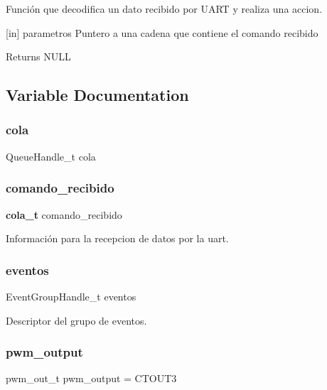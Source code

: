 Función que decodifica un dato recibido por U\+A\+RT y realiza una accion. 

[in] parametros Puntero a una cadena que contiene el comando recibido \begin{DoxyReturn}{Returns}
N\+U\+LL 
\end{DoxyReturn}


\subsection{Variable Documentation}
\mbox{\label{group__ejemplos_ga993b0270bc6a91f54621589ee6db4183}} 
\subsubsection{cola}
{\footnotesize\ttfamily Queue\+Handle\+\_\+t cola}

\mbox{\label{group__ejemplos_gae97d591c9b58416e82dd9dcdb95b685f}} 
\subsubsection{comando\+\_\+recibido}
{\footnotesize\ttfamily \textbf{ cola\+\_\+t} comando\+\_\+recibido}



Información para la recepcion de datos por la uart. 

\mbox{\label{group__ejemplos_ga206fec25e2c681344c76edfaae89c99c}} 
\subsubsection{eventos}
{\footnotesize\ttfamily Event\+Group\+Handle\+\_\+t eventos}



Descriptor del grupo de eventos. 

\mbox{\label{group__ejemplos_ga60bdd56461beea6551de9780d8fee5bd}} 
\subsubsection{pwm\+\_\+output}
{\footnotesize\ttfamily pwm\+\_\+out\+\_\+t pwm\+\_\+output = C\+T\+O\+U\+T3}



